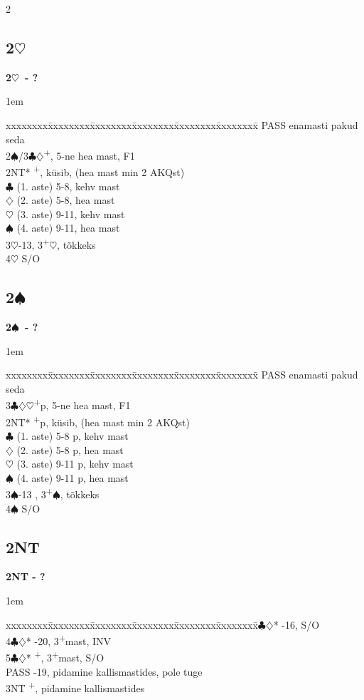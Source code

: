 \documentclass[10pt]{article}
\renewcommand{\c}{$\clubsuit$}
\renewcommand{\d}{$\diamondsuit$}
\newcommand{\h}{$\heartsuit$}
\newcommand{\s}{$\spadesuit$}
\newcommand{\p}{\textsuperscript{+}}
\newenvironment{bidtable}[1][]
{\textbf{#1}
  \begin{adjustwidth}{1em}{}
    \addvspace{2pt}
    \begin{tabbing}
      xxxxxxxx\=xxxxxxxx\=xxxxxxxx\=xxxxxxxx\=xxxxxxxx\=xxxxxxxx\=\kill}
{\end{tabbing}\end{adjustwidth}\bigskip}%
\newcommand{\pdfh}{\texorpdfstring{\h{}}{H}}
\newcommand{\pdfs}{\texorpdfstring{\s{}}{S}}
\begin{document}
\begin{multicols*}{2}
\subsection{2\pdfh}

\begin{bidtable}[2\h\ - ?]
PASS      \> enamasti pakud seda                  \\
2\s/3\c\d {}\p , 5-ne hea mast, F1             \\
2NT*      \p , küsib, (hea mast min 2 AKQst) \\
          \c \> (1. aste) 5-8, kehv mast      \\
          \d \> (2. aste) 5-8, hea mast       \\
          \h \> (3. aste) 9-11, kehv mast     \\
          \s \> (4. aste) 9-11, hea mast      \\
3\h       {}-13, 3\p\h, tõkkeks                 \\
4\h       \> S/O
\end{bidtable}

\subsection{2\pdfs}

\begin{bidtable}[2\s\ - ?]
PASS    \> enamasti pakud seda                   \\
3\c\d\h {}\p p, 5-ne hea mast, F1             \\
2NT*    \p p, küsib, (hea mast min 2 AKQst) \\
        \c \> (1. aste) 5-8 p, kehv mast     \\
        \d \> (2. aste) 5-8 p, hea mast      \\
        \h \> (3. aste) 9-11 p, kehv mast    \\
        \s \> (4. aste) 9-11 p, hea mast     \\
3\s     {}-13 , 3\p\s, tõkkeks                 \\
4\s     \> S/O
\end{bidtable}

\subsection{2NT}

\begin{bidtable}[2NT - ?]
3\c\d* {}-16, S/O                                 \\
4\c\d* {}-20, 3\p mast, INV                      \\
5\c\d* {}\p, 3\p mast, S/O                       \\
PASS   -19, pidamine kallismastides, pole tuge \\
3NT    \p, pidamine kallismastides
\end{bidtable}




\end{multicols*}
\end{document}
